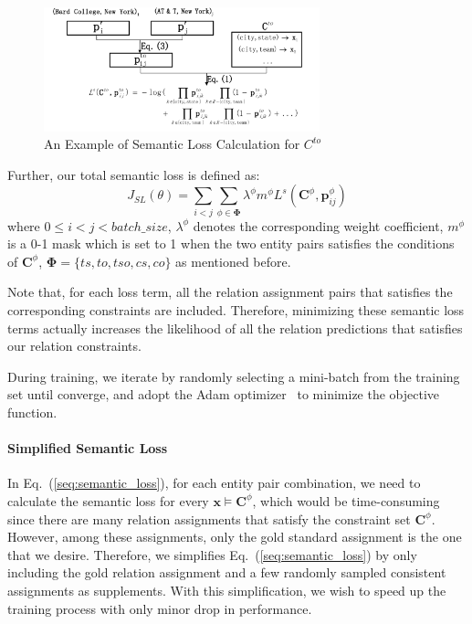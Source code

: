 \begin{figure}
	\centering
	\includegraphics[width=8cm]{./result-figure/example.pdf}
	\vspace{-2em}
	\caption{{\small An Example of Semantic Loss Calculation for $C^{to}$}}
	\label{fig:example}
	\vspace{-1.5em}
\end{figure}


Further, our total semantic loss is defined as:
\begin{equation}
	J_{SL}(\theta) = \sum\limits_{i < j}{\sum_{\phi \in \bm{\Phi}}{\lambda ^{\phi}m^{\phi}L^{s}(\bm{C}^{\phi}, \bm{p}_{ij}^{\phi})}}
\end{equation}
where $0\leq i < j < batch\_size$,
$\lambda^{\phi}$ denotes the corresponding weight coefficient, 
$m^{\phi}$ is a 0-1 mask which is set to 1 when the two entity pairs satisfies the conditions of $\bm{C}^{\phi}$,
$\bm{\Phi}=\{ts,to,tso,cs,co\}$ as mentioned before.

Note that, for each loss term, all the relation assignment pairs that satisfies the corresponding constraints are included.
Therefore, minimizing these semantic loss terms actually increases the likelihood of all the relation predictions that satisfies our relation constraints.

During training, we iterate by randomly selecting a mini-batch from the training set until converge, and adopt the Adam optimizer~\cite{kingma2014adam} to minimize the objective function.
\paragraph{Simplified Semantic Loss}
In Eq.~(\ref{seq:semantic_loss}), for each entity pair combination, we need to calculate the semantic loss for every $\bm x \models \bm{C}^{\phi}$, which would be time-consuming since there are many relation assignments that satisfy the constraint set $\bm{C}^{\phi}$.
However, among these assignments, only the gold standard assignment is the one that we desire.
Therefore, we simplifies Eq.~(\ref{seq:semantic_loss}) by only including the gold relation assignment and a few randomly sampled consistent assignments as supplements.
With this simplification, we wish to speed up the training process with only minor drop in performance.


